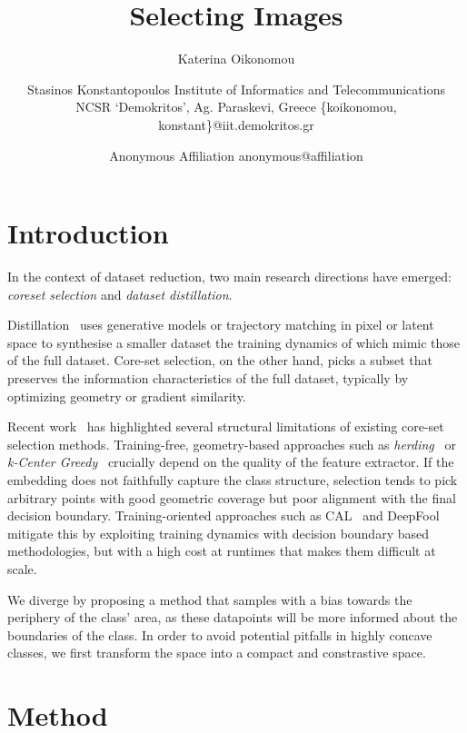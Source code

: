 \documentclass{article}
\title{Selecting Images}
\author{
Katerina Oikonomou \and Stasinos Konstantopoulos
\affiliations
Institute of Informatics and Telecommunications
\\ NCSR `Demokritos',
Ag. Paraskevi, Greece
\emails
\{koikonomou, konstant\}@iit.demokritos.gr
}
\author{
Anonymous
\affiliations
Affiliation
\emails
anonymous@affiliation
}
\begin{document}
\maketitle

\begin{abstract}


\end{abstract}

\section{Introduction}

In the context of dataset reduction, two main research directions have
emerged: \emph{coreset selection} and \emph{dataset distillation}.

Distillation~\cite{lei-tao:2024} uses generative models or trajectory
matching in pixel or latent space to synthesise a smaller dataset the
training dynamics of which mimic those of the full dataset.
Core-set selection, on the other hand, picks a subset that preserves
the information characteristics of the full dataset, typically by
optimizing geometry or gradient similarity.

Recent work~\cite{moser-shanbhag-etal:2025} has highlighted several
structural limitations of existing core-set selection methods.
Training-free, geometry-based approaches such as
\emph{herding}~\cite{welling:2009} or
\emph{k-Center Greedy}~\cite{sener-savarese:2017} crucially depend on the quality of
the feature extractor. If the embedding does not faithfully capture
the class structure, selection tends to pick arbitrary points with
good geometric coverage but poor alignment with the final decision
boundary.
Training-oriented approaches such as CAL~\cite{margatina-etal:2021}
and DeepFool~\cite{ducoffe-precioso:2018} mitigate this by exploiting
training dynamics with decision boundary based methodologies, but with
a high cost at runtimes that makes them difficult at scale.

We diverge by proposing a method that samples with a bias towards the
periphery of the class' area, as these datapoints will be more
informed about the boundaries of the class. In order to avoid
potential pitfalls in highly concave classes, we first transform the
space into a compact and constrastive space.


\section{Method}
\end{document}
